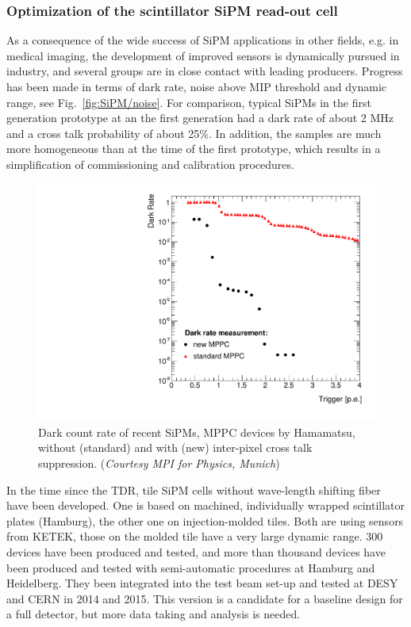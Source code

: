 
\subsubsection{Optimization of the scintillator SiPM read-out cell}
\label{sec:OptimizationSiPMRO}

As a consequence of the wide success of SiPM applications in other fields, e.g. in medical imaging, the development of improved sensors is dynamically pursued in industry, and several groups are in close contact with leading producers. Progress has been made in terms of dark rate, noise above MIP threshold and dynamic range, see Fig.~\ref{fig:SiPM/noise}. For comparison, typical SiPMs in the first generation prototype at an the first generation had a dark rate of about 2 MHz and a cross talk probability of about 25\%. In addition, the samples are much more homogeneous than at the time of the first prototype, which results in a simplification of commissioning and calibration procedures.
%
\begin{figure}[htb]
\begin{center}
\includegraphics[width=0.5\hsize]{DarkCount.pdf}
\end{center}
\caption{\label{fig:SiPM-noise} Dark count rate of recent SiPMs, MPPC devices by Hamamatsu, without (standard) and with (new) inter-pixel cross talk suppression. ({\it Courtesy MPI for Physics, Munich})}
\end{figure}

In the time since the TDR, tile SiPM cells without wave-length shifting fiber have been developed. One is based on machined, individually wrapped scintillator plates (Hamburg), the other one on injection-molded tiles. Both are using sensors from KETEK, those on the molded tile have a very large dynamic range. 300 devices have been produced and tested, and more than thousand devices have been produced and tested with semi-automatic procedures at Hamburg and Heidelberg. They been integrated into the test beam set-up and tested at DESY and CERN in 2014 and 2015. This version is a candidate for a baseline design for a full detector, but more data taking and analysis is needed.

